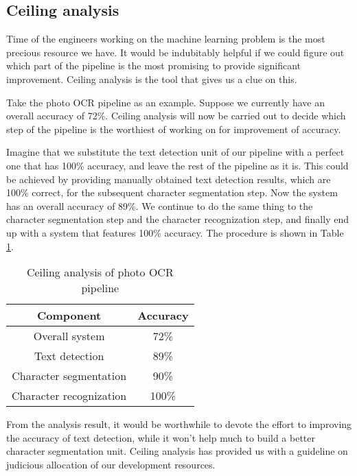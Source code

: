 \subsection{Ceiling analysis}
Time of the engineers working on the machine learning problem is the most precious resource we have. It would be indubitably helpful if we could figure out which part of the pipeline is the most promising to provide significant improvement. Ceiling analysis is the tool that gives us a clue on this.

Take the photo OCR pipeline as an example. Suppose we currently have an overall accuracy of 72\%. Ceiling analysis will now be carried out to decide which step of the pipeline is the worthiest of working on for improvement of accuracy.

Imagine that we substitute the text detection unit of our pipeline with a perfect one that has 100\% accuracy, and leave the rest of the pipeline as it is. This could be achieved by providing manually obtained text detection results, which are 100\% correct, for the subsequent character segmentation step. Now the system has an overall accuracy of 89\%. We continue to do the same thing to the character segmentation step and the character recognization step, and finally end up with a system that features 100\% accuracy. The procedure is shown in Table \ref{ceiling}.

\begin{table}[ht]
\centering
\caption{Ceiling analysis of photo OCR pipeline}\label{ceiling}
\begin{tabular}{c|c}
Component & Accuracy\\\hline
Overall system & 72\% \\
Text detection & 89\% \\
Character segmentation & 90\% \\
Character recognization & 100\%
\end{tabular}
\end{table}

From the analysis result, it would be worthwhile to devote the effort to improving the accuracy of text detection, while it won't help much to build a better character segmentation unit. Ceiling analysis has provided us with a guideline on judicious allocation of our development resources. 
\ifx\PREAMBLE\undefined

\fi